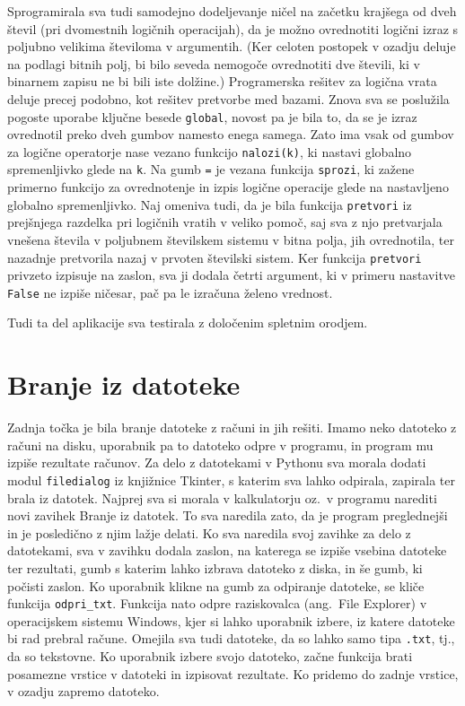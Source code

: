 \documentclass[12pt]{article}
\begin{document}
	Sprogramirala sva tudi samodejno dodeljevanje ničel na začetku krajšega od dveh števil (pri dvomestnih logičnih operacijah), da je možno ovrednotiti logični izraz s poljubno velikima številoma v argumentih. (Ker celoten postopek v ozadju deluje na podlagi bitnih polj, bi bilo seveda nemogoče ovrednotiti dve števili, ki v binarnem zapisu ne bi bili iste dolžine.) Programerska rešitev za logična vrata deluje precej podobno, kot rešitev pretvorbe med bazami. Znova sva se poslužila pogoste uporabe ključne besede \texttt{global}, novost pa je bila to, da se je izraz ovrednotil preko dveh gumbov namesto enega samega. Zato ima vsak od gumbov za logične operatorje nase vezano funkcijo \texttt{nalozi(k)}, ki nastavi globalno spremenljivko glede na \texttt{k}. Na gumb \texttt{=} je vezana funkcija \texttt{sprozi}, ki zažene primerno funkcijo za ovrednotenje in izpis logične operacije glede na nastavljeno globalno spremenljivko. Naj omeniva tudi, da je bila funkcija \texttt{pretvori} iz prejšnjega razdelka pri logičnih vratih v veliko pomoč, saj sva z njo pretvarjala vnešena števila v poljubnem številskem sistemu v bitna polja, jih ovrednotila, ter nazadnje pretvorila nazaj v prvoten številski sistem. Ker funkcija \texttt{pretvori} privzeto izpisuje na zaslon, sva ji dodala četrti argument, ki v primeru nastavitve \texttt{False} ne izpiše ničesar, pač pa le izračuna želeno vrednost.
	
	Tudi ta del aplikacije sva testirala z določenim spletnim orodjem.\cite{log}
	
	\section{Branje iz datoteke}
	
	Zadnja točka je bila branje datoteke z računi in jih rešiti. Imamo neko datoteko z računi na disku,
	uporabnik pa to datoteko odpre v programu, in program mu izpiše rezultate računov. Za delo z datotekami v 
	Pythonu sva morala dodati modul \texttt{filedialog} iz knjižnice Tkinter, s katerim sva lahko odpirala, zapirala ter
	brala iz datotek. Najprej sva si morala v kalkulatorju oz.~v programu narediti novi zavihek Branje iz datotek.
	To sva naredila zato, da je program preglednejši in je posledično z njim lažje delati. Ko sva naredila svoj zavihke za
	delo z datotekami, sva v zavihku dodala zaslon, na katerega se izpiše vsebina datoteke ter rezultati, gumb s 
	katerim lahko izbrava datoteko z diska, in še gumb, ki počisti zaslon. Ko uporabnik klikne na gumb
	za odpiranje datoteke, se kliče funkcija \texttt{odpri\_txt}. Funkcija nato odpre raziskovalca (ang.~File Explorer) v
	operacijskem sistemu Windows, kjer si lahko uporabnik izbere, iz katere datoteke bi rad prebral račune. Omejila sva
	tudi datoteke, da so lahko samo tipa \texttt{.txt}, tj., da so tekstovne. Ko uporabnik izbere svojo datoteko, začne funkcija\cite{read} brati posamezne vrstice v datoteki in izpisovat rezultate. Ko pridemo do zadnje vrstice, v ozadju zapremo datoteko.

	
	\pagebreak
	
	\printbibliography
	
\end{document}
